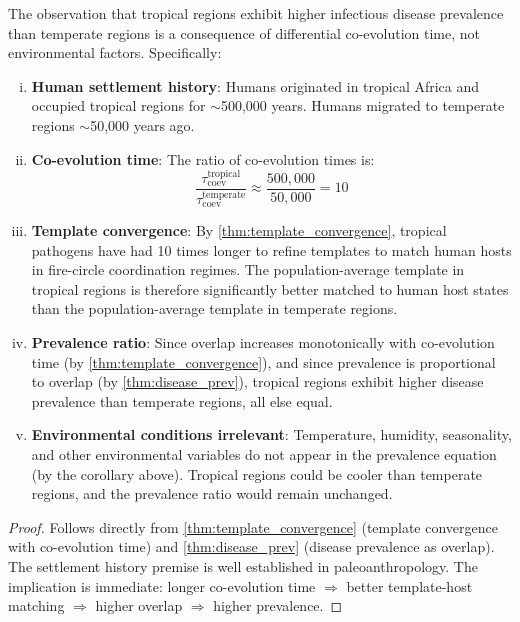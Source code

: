 \documentclass[11pt,twocolumn,a4paper]{article}
\begin{document}
\begin{theorem}
\label{thm:tropical}
The observation that tropical regions exhibit higher infectious disease prevalence than temperate regions is a consequence of differential co-evolution time, not environmental factors. Specifically:

\begin{enumerate}[(i)]
\item \textbf{Human settlement history}: Humans originated in tropical Africa and occupied tropical regions for $\sim$500,000 years. Humans migrated to temperate regions $\sim$50,000 years ago.

\item \textbf{Co-evolution time}: The ratio of co-evolution times is:
\begin{equation}
\frac{\tau_{\mathrm{coev}}^{\mathrm{tropical}}}{\tau_{\mathrm{coev}}^{\mathrm{temperate}}} \approx \frac{500{,}000}{50{,}000} = 10
\label{eq:coev_ratio}
\end{equation}

\item \textbf{Template convergence}: By \cref{thm:template_convergence}, tropical pathogens have had 10 times longer to refine templates to match human hosts in fire-circle coordination regimes. The population-average template in tropical regions is therefore significantly better matched to human host states than the population-average template in temperate regions.

\item \textbf{Prevalence ratio}: Since overlap increases monotonically with co-evolution time (by \cref{thm:template_convergence}), and since prevalence is proportional to overlap (by \cref{thm:disease_prev}), tropical regions exhibit higher disease prevalence than temperate regions, all else equal.

\item \textbf{Environmental conditions irrelevant}: Temperature, humidity, seasonality, and other environmental variables do not appear in the prevalence equation (by the corollary above). Tropical regions could be cooler than temperate regions, and the prevalence ratio would remain unchanged.
\end{enumerate}
\end{theorem}

\begin{proof}
Follows directly from \cref{thm:template_convergence} (template convergence with co-evolution time) and \cref{thm:disease_prev} (disease prevalence as overlap). The settlement history premise is well established in paleoanthropology. The implication is immediate: longer co-evolution time $\Rightarrow$ better template-host matching $\Rightarrow$ higher overlap $\Rightarrow$ higher prevalence.
\end{proof}
\end{document}
